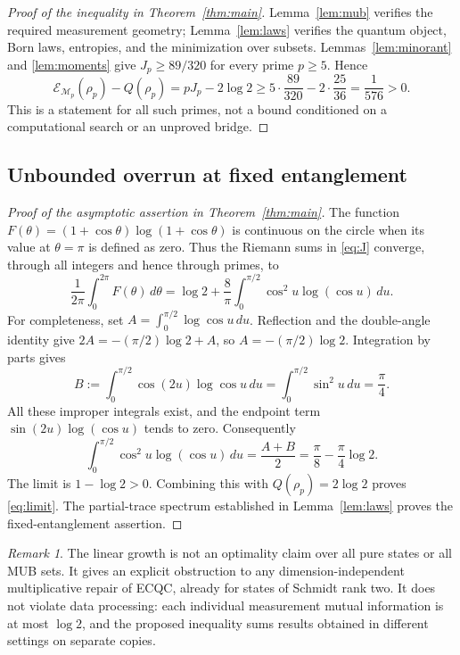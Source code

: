 \documentclass[11pt]{article}
\theoremstyle{remark}
\newtheorem{remark}[theorem]{Remark}
\newcommand{\E}{\mathcal E}
\newcommand{\M}{\mathcal M}
\begin{document}
\begin{proof}[Proof of the inequality in Theorem~\ref{thm:main}]
Lemma~\ref{lem:mub} verifies the required measurement geometry; Lemma~\ref{lem:laws} verifies the quantum object, Born laws, entropies, and the minimization over subsets. Lemmas~\ref{lem:minorant} and \ref{lem:moments} give $J_p\geq89/320$ for every prime $p\geq5$. Hence
\[
 \E_{\M_p}(\rho_p)-Q(\rho_p)
 =pJ_p-2\log2
 \geq5\cdot\frac{89}{320}-2\cdot\frac{25}{36}
 =\frac1{576}>0.
\]
This is a statement for all such primes, not a bound conditioned on a computational search or an unproved bridge.
\end{proof}

\subsection{Unbounded overrun at fixed entanglement}
\begin{proof}[Proof of the asymptotic assertion in Theorem~\ref{thm:main}]
The function
$F(\theta)=(1+\cos\theta)\log(1+\cos\theta)$
is continuous on the circle when its value at $\theta=\pi$ is defined as zero. Thus the Riemann sums in \eqref{eq:J} converge, through all integers and hence through primes, to
\[
 \frac1{2\pi}\int_0^{2\pi}F(\theta)\,d\theta
 =\log2+\frac8\pi\int_0^{\pi/2}\cos^2u\log(\cos u)\,du.
\]
For completeness, set $A=\int_0^{\pi/2}\log\cos u\,du$. Reflection and the double-angle identity give
$2A=-(\pi/2)\log2+A$, so $A=-(\pi/2)\log2$.
Integration by parts gives
\[
 B:=\int_0^{\pi/2}\cos(2u)\log\cos u\,du
 =\int_0^{\pi/2}\sin^2u\,du=\frac\pi4.
\]
All these improper integrals exist, and the endpoint term
$\sin(2u)\log(\cos u)$ tends to zero. Consequently
\[
 \int_0^{\pi/2}\cos^2u\log(\cos u)\,du
 =\frac{A+B}{2}=\frac\pi8-\frac\pi4\log2.
\]
The limit is $1-\log2>0$. Combining this with $Q(\rho_p)=2\log2$ proves \eqref{eq:limit}. The partial-trace spectrum established in Lemma~\ref{lem:laws} proves the fixed-entanglement assertion.
\end{proof}

\begin{remark}
The linear growth is not an optimality claim over all pure states or all MUB sets. It gives an explicit obstruction to any dimension-independent multiplicative repair of ECQC, already for states of Schmidt rank two. It does not violate data processing: each individual measurement mutual information is at most $\log2$, and the proposed inequality sums results obtained in different settings on separate copies.
\end{remark}
\end{document}
